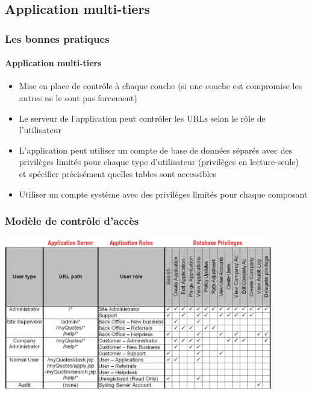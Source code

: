 \documentclass{beamer}
\begin{document}
\subsection{Application multi-tiers}
\begin{frame}
  \frametitle{Les bonnes pratiques}
  \framesubtitle{Application multi-tiers}
  \begin{exampleblock}{}
    \begin{itemize}
      \item Mise en place de contrôle à chaque couche (si une couche est compromise les autres ne le sont pas forcement)
      \item Le serveur de l'application peut contrôler les URLs selon le rôle de l'utilisateur
      \item L'application peut utiliser un compte de base de données séparés avec des privilèges limités pour chaque type d'utilisateur (privilèges en lecture-seule) et spécifier précisément quelles tables sont accessibles
      \item Utiliser un compte système avec des privilèges limités pour chaque composant
    \end{itemize}
  \end{exampleblock}
\end{frame}

\begin{frame}
  \frametitle{Modèle de contrôle d'accès}
  \begin{center}
    \includegraphics[height=18em]{matrice-droit}
  \end{center}
\end{frame}
\end{document}
